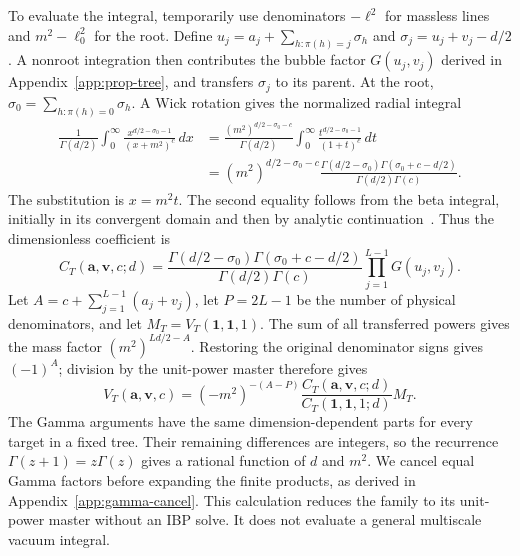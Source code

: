 To evaluate the integral, temporarily use denominators $-\ell^2$ for massless lines and $m^2-\ell_0^2$ for the root. Define $u_j=a_j+\sum_{h:\pi(h)=j}\sigma_h$ and $\sigma_j=u_j+v_j-d/2$. A nonroot integration then contributes the bubble factor $G(u_j,v_j)$ derived in Appendix~\ref{app:prop-tree}, and transfers $\sigma_j$ to its parent. At the root, $\sigma_0=\sum_{h:\pi(h)=0}\sigma_h$. A Wick rotation gives the normalized radial integral
\begin{align}
 \frac{1}{\Gamma(d/2)}\int_0^\infty
 \frac{x^{d/2-\sigma_0-1}}{(x+m^2)^c}\,dx
 &=\frac{(m^2)^{d/2-\sigma_0-c}}{\Gamma(d/2)}
 \int_0^\infty\frac{t^{d/2-\sigma_0-1}}{(1+t)^c}\,dt \nonumber\\
 &=(m^2)^{d/2-\sigma_0-c}
 \frac{\Gamma(d/2-\sigma_0)\Gamma(\sigma_0+c-d/2)}
 {\Gamma(d/2)\Gamma(c)} .
 \label{eq:vac-ml-radial}
\end{align}
The substitution is $x=m^2t$. The second equality follows from the beta integral, initially in its convergent domain and then by analytic continuation~\cite{Weinzierl2022}. Thus the dimensionless coefficient is
\begin{equation}
 C_T(\mathbf a,\mathbf v,c;d)=
 \frac{\Gamma(d/2-\sigma_0)\Gamma(\sigma_0+c-d/2)}{\Gamma(d/2)\Gamma(c)}
 \prod_{j=1}^{L-1}G(u_j,v_j).
 \label{eq:vac-ml-gamma}
\end{equation}
Let $A=c+\sum_{j=1}^{L-1}(a_j+v_j)$, let $P=2L-1$ be the number of physical denominators, and let $M_T=V_T(\mathbf1,\mathbf1,1)$. The sum of all transferred powers gives the mass factor $(m^2)^{Ld/2-A}$. Restoring the original denominator signs gives $(-1)^A$; division by the unit-power master therefore gives
\begin{equation}
 V_T(\mathbf a,\mathbf v,c)=
 (-m^2)^{-(A-P)}
 \frac{C_T(\mathbf a,\mathbf v,c;d)}{C_T(\mathbf1,\mathbf1,1;d)}M_T.
 \label{eq:vac-ml-ratio}
\end{equation}
The Gamma arguments have the same dimension-dependent parts for every target in a fixed tree. Their remaining differences are integers, so the recurrence $\Gamma(z+1)=z\Gamma(z)$ gives a rational function of $d$ and $m^2$. We cancel equal Gamma factors before expanding the finite products, as derived in Appendix~\ref{app:gamma-cancel}. This calculation reduces the family to its unit-power master without an IBP solve. It does not evaluate a general multiscale vacuum integral.

